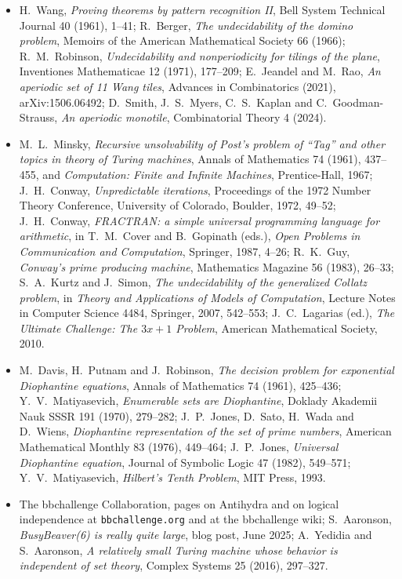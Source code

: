 \begin{itemize}
\item H.~Wang, \emph{Proving theorems by pattern recognition II}, Bell System Technical Journal 40 (1961), 1--41; R.~Berger, \emph{The undecidability of the domino problem}, Memoirs of the American Mathematical Society 66 (1966); R.~M.~Robinson, \emph{Undecidability and nonperiodicity for tilings of the plane}, Inventiones Mathematicae 12 (1971), 177--209; E.~Jeandel and M.~Rao, \emph{An aperiodic set of 11 Wang tiles}, Advances in Combinatorics (2021), arXiv:1506.06492; D.~Smith, J.~S.~Myers, C.~S.~Kaplan and C.~Goodman-Strauss, \emph{An aperiodic monotile}, Combinatorial Theory 4 (2024).
\item M.~L.~Minsky, \emph{Recursive unsolvability of Post's problem of ``Tag'' and other topics in theory of Turing machines}, Annals of Mathematics 74 (1961), 437--455, and \emph{Computation: Finite and Infinite Machines}, Prentice-Hall, 1967; J.~H.~Conway, \emph{Unpredictable iterations}, Proceedings of the 1972 Number Theory Conference, University of Colorado, Boulder, 1972, 49--52; J.~H.~Conway, \emph{FRACTRAN: a simple universal programming language for arithmetic}, in T.~M.~Cover and B.~Gopinath (eds.), \emph{Open Problems in Communication and Computation}, Springer, 1987, 4--26; R.~K.~Guy, \emph{Conway's prime producing machine}, Mathematics Magazine 56 (1983), 26--33; S.~A.~Kurtz and J.~Simon, \emph{The undecidability of the generalized Collatz problem}, in \emph{Theory and Applications of Models of Computation}, Lecture Notes in Computer Science 4484, Springer, 2007, 542--553; J.~C.~Lagarias (ed.), \emph{The Ultimate Challenge: The $3x+1$ Problem}, American Mathematical Society, 2010.
\item M.~Davis, H.~Putnam and J.~Robinson, \emph{The decision problem for exponential Diophantine equations}, Annals of Mathematics 74 (1961), 425--436; Y.~V.~Matiyasevich, \emph{Enumerable sets are Diophantine}, Doklady Akademii Nauk SSSR 191 (1970), 279--282; J.~P.~Jones, D.~Sato, H.~Wada and D.~Wiens, \emph{Diophantine representation of the set of prime numbers}, American Mathematical Monthly 83 (1976), 449--464; J.~P.~Jones, \emph{Universal Diophantine equation}, Journal of Symbolic Logic 47 (1982), 549--571; Y.~V.~Matiyasevich, \emph{Hilbert's Tenth Problem}, MIT Press, 1993.
\item The bbchallenge Collaboration, pages on Antihydra and on logical independence at \texttt{bbchallenge.org} and at the bbchallenge wiki; S.~Aaronson, \emph{BusyBeaver(6) is really quite large}, blog post, June 2025; A.~Yedidia and S.~Aaronson, \emph{A relatively small Turing machine whose behavior is independent of set theory}, Complex Systems 25 (2016), 297--327.
\end{itemize}
